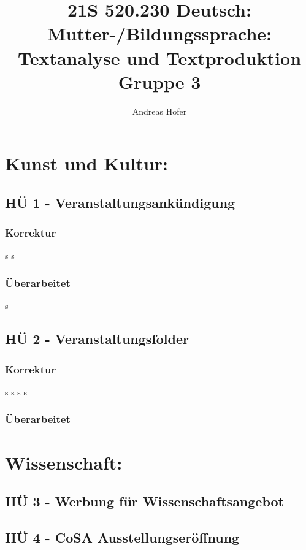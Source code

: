 \documentclass{article}
\title{\vspace{-3cm}21S 520.230 Deutsch: Mutter-/Bildungssprache: Textanalyse und Textproduktion Gruppe 3}
\author{Andreas Hofer}
\begin{document}
	\tableofcontents
	\newpage
	\section{Kunst und Kultur:}
	\subsection{HÜ 1 - Veranstaltungsankündigung}
	\subsubsection{Korrektur}
	\newpage
	s
	\newpage
	s
	\newpage
	\subsubsection{Überarbeitet}
	\newpage
	s
	\subsection{HÜ 2 - Veranstaltungsfolder}
	\subsubsection{Korrektur}
	\newpage
	s
	\newpage
	s
	\newpage
	s
	\newpage
	s
	\newpage
	\subsubsection{Überarbeitet}
	\newpage
	\section{Wissenschaft:}
	\subsection{HÜ 3 - Werbung für Wissenschaftsangebot}
	\newpage
	\subsection{HÜ 4 - CoSA Ausstellungseröffnung}
	
\end{document}
